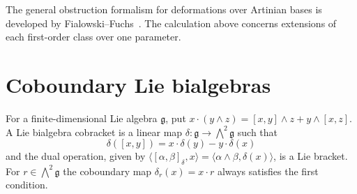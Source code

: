 The general obstruction formalism for deformations over Artinian
bases is developed by Fialowski--Fuchs~\cite[Sections 1 and 3]{fialowski-fuchs}.
The calculation above concerns extensions of each first-order class
over one parameter.

\section{Coboundary Lie bialgebras}

\begin{definition}
\label{res:LD04}
For a finite-dimensional Lie algebra \(\mathfrak g\), put
\(x\cdot(y\wedge z)=[x,y]\wedge z+y\wedge[x,z]\).
A Lie bialgebra cobracket is a linear map
\(\delta:\mathfrak g\to\bigwedge^2\mathfrak g\)
such that
\[
 \delta([x,y])=x\cdot\delta(y)-y\cdot\delta(x)
\]
and the dual operation, given by
\(\langle[\alpha,\beta]_\delta,x\rangle
=\langle\alpha\wedge\beta,\delta(x)\rangle\), is a Lie bracket.
For \(r\in\bigwedge^2\mathfrak g\) the coboundary map
\(\delta_r(x)=x\cdot r\) always satisfies the first condition.
\end{definition}

